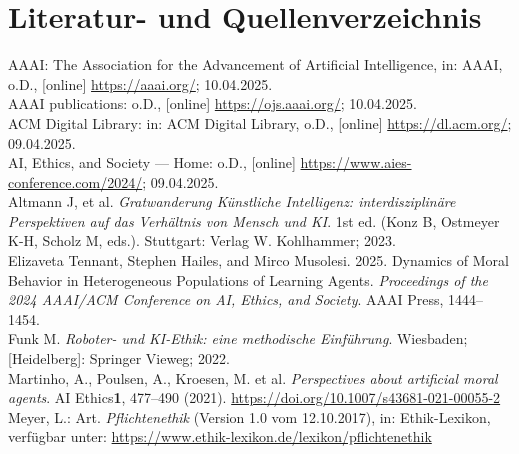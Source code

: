 \section{Literatur- und Quellenverzeichnis}\label{sec::literaturverzeichnis}

AAAI: The Association for the Advancement of Artificial Intelligence, in: AAAI, o.D., [online] \href{https://aaai.org/}{https://aaai.org/}; 10.04.2025.\\
\newline
AAAI publications: o.D., [online] \href{https://ojs.aaai.org/}{https://ojs.aaai.org/}; 10.04.2025.\\
\newline
ACM Digital Library: in: ACM Digital Library, o.D., [online] \href{https://dl.acm.org/}{https://dl.acm.org/}; 09.04.2025. \\
\newline
AI, Ethics, and Society — Home: o.D., [online] \href{https://www.aies-conference.com/2024/}{https://www.aies-conference.com/2024/}; 09.04.2025. \\
\newline
Altmann J, et al.
\textit{Gratwanderung Künstliche Intelligenz: interdisziplinäre Perspektiven auf das Verhältnis von Mensch und KI}.
1st ed.
(Konz B, Ostmeyer K-H, Scholz M, eds.). Stuttgart: Verlag W. Kohlhammer; 2023. \\
\newline
Elizaveta Tennant, Stephen Hailes, and Mirco Musolesi. 2025.
Dynamics of Moral Behavior in Heterogeneous Populations of Learning Agents.
\textit{Proceedings of the 2024 AAAI/ACM Conference on AI, Ethics, and Society}.
AAAI Press, 1444–1454. \\
\newline
Funk M.
\textit{Roboter- und KI-Ethik: eine methodische Einführung}.
Wiesbaden; [Heidelberg]: Springer Vieweg; 2022. \\
\newline
Martinho, A., Poulsen, A., Kroesen, M. et al. \textit{Perspectives about artificial moral agents}.
AI Ethics\textbf{1}, 477–490 (2021).
\href{https://doi.org/10.1007/s43681-021-00055-2}{https://doi.org/10.1007/s43681-021-00055-2} \\
\newline
Meyer, L.: Art.
\textit{Pflichtenethik} (Version 1.0 vom 12.10.2017), in: Ethik-Lexikon, verfügbar unter:
\href{https://www.ethik-lexikon.de/lexikon/pflichtenethik}{https://www.ethik-lexikon.de/lexikon/pflichtenethik} \\
\newline
